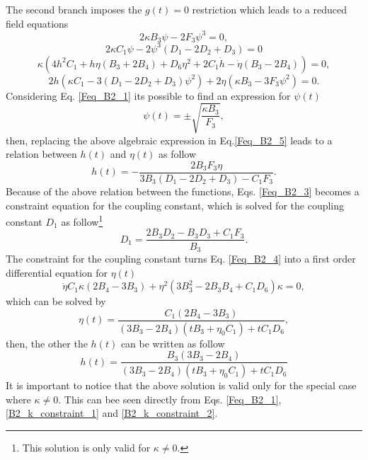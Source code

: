 The second branch imposes the $g(t) = 0$ restriction which leads to a reduced field equations
\begin{dmath}
    \label{Feq_B2_1}
    2\kappa B_3 \psi - 2F_3\psi^3= 0,
\end{dmath}
\begin{dmath}
    \label{Feq_B2_3}
    2\kappa C_1\psi - 2\psi^3 \left(D_1 - 2D_2 + D_3\right) = 0
\end{dmath}
\begin{dmath}
    \label{Feq_B2_4}
    \kappa\left(4h^2C_1 + h\eta\left(B_3 + 2B_4\right) + D_6\eta^2 + 2C_1\dot{h} - \dot{\eta}\left(B_3 - 2B_4\right)\right) = 0,
\end{dmath}
\begin{dmath}
    \label{Feq_B2_5}
    2h \left(\kappa C_1 - 3\left(D_1 - 2D_2 + D_3\right) \psi^2\right) + 2\eta\left(\kappa B_3 - 3F_3\psi^2\right) = 0.
\end{dmath}
Considering Eq. \eqref{Feq_B2_1} its possible to find an expression for $\psi(t)$
\begin{equation}
    \psi(t) = \pm \sqrt{\frac{\kappa B_3}{F_3}},
\end{equation}
then, replacing the above algebraic expression in Eq.\eqref{Feq_B2_5} leads to a relation between $h(t)$ and $\eta(t)$ as follow
\begin{equation}
    h(t) = - \frac{2B_3F_3 \eta}{3B_3 \left(D_1 - 2D_2 + D_3\right) - C_1F_3}.
\end{equation}
Because of the above relation between the functions, Eqs. \eqref{Feq_B2_3} becomes a constraint equation for the coupling constant,
which is solved for the coupling constant $D_1$ as follow\footnote{This solution is only valid for $\kappa \neq 0$.}
\begin{equation}
    \label{B2_k_constraint_1}
	 D_1 = \frac{2B_3D_2 - B_3D_3 + C_1F_3}{B_3}.
\end{equation} 
The constraint for the coupling constant turns Eq. \eqref{Feq_B2_4} into a first order differential equation for $\eta(t)$
\begin{equation}
    \label{B2_k_constraint_2}
    \dot{\eta}C_1 \kappa \left(2B_4 - 3B_3\right) + \eta^2 \left(3B_3^2 - 2B_3 B_4 + C_1D_6\right)\kappa = 0,
\end{equation}
which can be solved by
\begin{equation}
    \eta(t) = \frac{C_1\left(2B_4 - 3B_3\right)}{\left(3B_3 - 2B_4\right)\left(tB_3 + \eta_0 C_1\right) + tC_1D_6},
\end{equation}
then, the other the $h(t)$ can be written as follow
\begin{equation}
    h(t) = \frac{B_3\left(3B_3 - 2B_4\right)}{\left(3B_3 - 2B_4\right)\left(tB_3 + \eta_0 C_1\right) + tC_1D_6} 
\end{equation}
It is important to notice that the above solution is valid only for the special case where $\kappa \neq 0$.
This can bee seen directly from Eqs. \eqref{Feq_B2_1}, \eqref{B2_k_constraint_1} and \eqref{B2_k_constraint_2}. 

